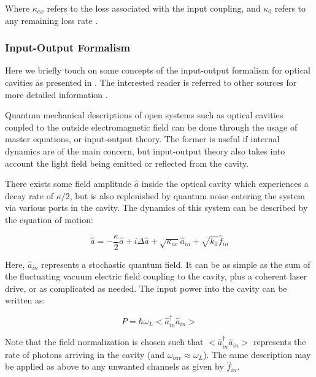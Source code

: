 \documentclass[%
 reprint,
nofootinbib,
 amsmath,amssymb,
 aps,
]{revtex4-2}
\begin{document}
Where $\kappa_{ex}$ refers to the loss associated with the input coupling, and $\kappa_{0}$ refers to any remaining loss rate \cite{cavity_optomechanics_2014}. 

\subsubsection{Input-Output Formalism}

Here we briefly touch on some concepts of the input-output formalism for optical cavities as presented in \cite{cavity_optomechanics_2014}. The interested reader is referred to other sources for more detailed information \cite{cavity_optomechanics_2014}.
\newline

Quantum mechanical descriptions of open systems such as optical cavities coupled to the outside electromagnetic field can be done through the usage of master equations, or input-output theory. The former is useful if internal dynamics are of the main concern, but input-output theory also takes into account the light field being emitted or reflected from the cavity.
\newline

There exists some field amplitude $\hat{a}$ inside the optical cavity which experiences a decay rate of $\kappa /2$, but is also replenished by quantum noise entering the system via various ports in the cavity. The dynamics of this system can be described by the equation of motion:

\begin{equation}\label{eq:equation_of_motion_cavity}
    \dot{\hat{a}} = -\frac{\kappa}{2}\hat{a} + i\Delta\hat{a} + \sqrt{\kappa_{ex}}\hat{a}_{in} + \sqrt{k_{0}}\hat{f}_{in}
\end{equation}

Here, $\hat{a}_{in}$ represents a stochastic quantum field. It can be as simple as the sum of the fluctuating vacuum electric field coupling to the cavity, plus a coherent laser drive, or as complicated as needed. The input power into the cavity can be written as:

\begin{equation}\label{eq:Power_eq}
    P = \hbar \omega_{L} \big < \hat{a}_{in}^{\dagger} \hat{a}_{in} \big >
\end{equation}

Note that the field normalization is chosen such that $\big < \hat{a}_{in}^{\dagger} \hat{a}_{in} \big >$ represents the rate of photons arriving in the cavity (and $\omega_{cav} \approx \omega_{L}$). The same description may be applied as above to any unwanted channels as given by $\hat{f}_{in}$.
\newline
\end{document}
